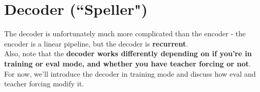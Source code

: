 \documentclass{article}
\newcommand{\ttt}[1]{\texttt{#1}}
\begin{document}
\newpage






\newpage


\section{Decoder (``Speller")}


The decoder is unfortunately much more complicated than the encoder - the encoder is a linear pipeline, but the decoder is \textbf{recurrent}. \\

Also, note that the \textbf{decoder works differently depending on if you're in training or eval mode, and whether you have teacher forcing or not}. For now, we'll introduce the decoder in training mode and discuss how eval and teacher forcing modify it.





\end{document}
